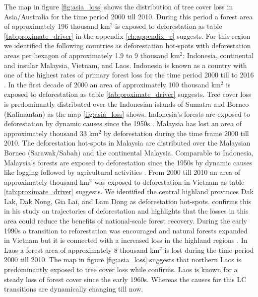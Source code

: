 			The map in figure \ref{fig:asia_loss} shows the distribution of tree cover loss in Asia/Australia for the time period 2000 till 2010. During this period a forest area of approximately 196 thousand km$^2$ is exposed to deforestation as table \ref{tab:proximate_driver} in the appendix \ref{ch:appendix_c} suggests. For this region we identified the following countries as deforestation hot-spots with deforestation areas per hexagon of approximately 1.9 to 9 thousand km$^2$: Indonesia, continental and insular Malaysia, Vietnam, and Laos. Indonesia is known as a country with one of the highest rates of primary forest loss for the time period 2000 till to 2016 \citep{Austin2019}. In the first decade of 2000 an area of approximately 100 thousand km$^2$ is exposed to deforestation as table \ref{tab:proximate_driver} suggests. Tree cover loss is predominantly distributed over the Indonesian islands of Sumatra and Borneo (Kalimantan) as the map \ref{fig:asia_loss} shows. Indonesia's forests are exposed to deforestation by dynamic causes since the 1950s \citep{Nawir2007}. Malaysia has lost an area of approximately thousand 33 km$^2$ by deforestation during the time frame 2000 till 2010. The deforestation hot-spots in Malaysia are distributed over the Malaysian Borneo (Sarawak/Sabah) and the continental Malaysia. Comparable to Indonesia, Malaysia's forests are exposed to deforestation since the 1950s by dynamic causes like logging followed by agricultural activities \citep{Kummer1994}. From 2000 till 2010 an area of approximately thousand km$^2$ was exposed to deforestation in Vietnam as table \ref{tab:proximate_driver} suggests. We identified the central highland provinces Dak Lak, Dak Nong, Gia Lai, and Lam Dong as deforestation hot-spots. \citet{Meyfroidt2013} confirms this in his study on trajectories of deforestation and highlights that the losses in this area could reduce the benefits of national-scale forest recovery. During the early 1990s a transition to reforestation was encouraged and natural forests expanded in Vietnam but it is connected with a increased loss in the highland regions \citep{Meyfroidt2013,Chazdon2008}. In Laos a forest area of approximately 8 thousand km$^2$ is lost during the time period 2000 till 2010. The map in figure \ref{fig:asia_loss} suggests that northern Laos is predominantly exposed to tree cover loss while \citet{Hirsch2000} confirms. Laos is known for a steady loss of forest cover since the early 1960s. Whereas the causes for this \ac{LC} transitions are dynamically changing till now.
